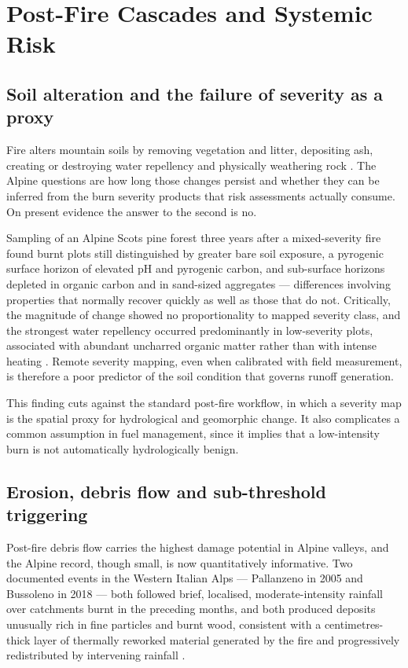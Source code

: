 \documentclass[11pt,a4paper]{article}
\begin{document}
\section{Post-Fire Cascades and Systemic Risk}
\label{sec:cascade}

\subsection{Soil alteration and the failure of severity as a proxy}

Fire alters mountain soils by removing vegetation and litter, depositing ash, creating or destroying water repellency and physically weathering rock \citep{santi_wildfire_2022}. The Alpine questions are how long those changes persist and whether they can be inferred from the burn severity products that risk assessments actually consume. On present evidence the answer to the second is no.

Sampling of an Alpine Scots pine forest three years after a mixed-severity fire found burnt plots still distinguished by greater bare soil exposure, a pyrogenic surface horizon of elevated pH and pyrogenic carbon, and sub-surface horizons depleted in organic carbon and in sand-sized aggregates --- differences involving properties that normally recover quickly as well as those that do not. Critically, the magnitude of change showed no proportionality to mapped severity class, and the strongest water repellency occurred predominantly in low-severity plots, associated with abundant uncharred organic matter rather than with intense heating \citep{negri_wildfire_2026}. Remote severity mapping, even when calibrated with field measurement, is therefore a poor predictor of the soil condition that governs runoff generation.

This finding cuts against the standard post-fire workflow, in which a severity map is the spatial proxy for hydrological and geomorphic change. It also complicates a common assumption in fuel management, since it implies that a low-intensity burn is not automatically hydrologically benign.

\subsection{Erosion, debris flow and sub-threshold triggering}

Post-fire debris flow carries the highest damage potential in Alpine valleys, and the Alpine record, though small, is now quantitatively informative. Two documented events in the Western Italian Alps --- Pallanzeno in 2005 and Bussoleno in 2018 --- both followed brief, localised, moderate-intensity rainfall over catchments burnt in the preceding months, and both produced deposits unusually rich in fine particles and burnt wood, consistent with a centimetres-thick layer of thermally reworked material generated by the fire and progressively redistributed by intervening rainfall \citep{tiranti_wildfires_2021}.
\end{document}
